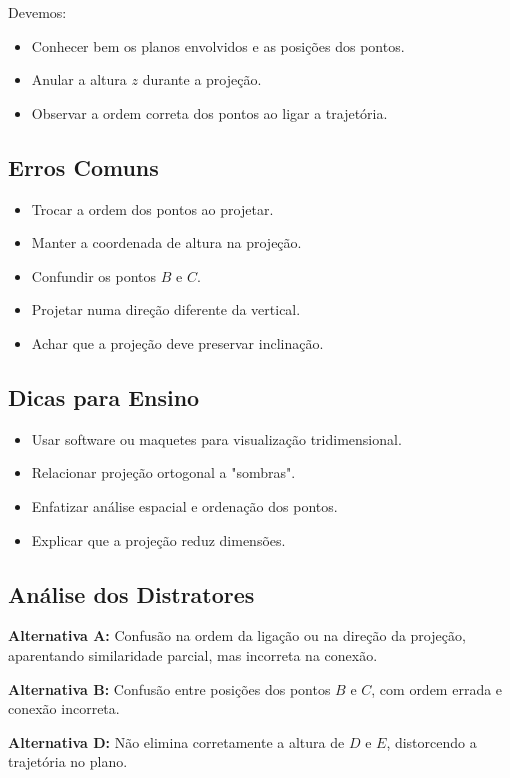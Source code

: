 \documentclass{article}
\begin{document}
Devemos:
\begin{itemize}
  \item Conhecer bem os planos envolvidos e as posições dos pontos.
  \item Anular a altura \( z \) durante a projeção.
  \item Observar a ordem correta dos pontos ao ligar a trajetória.
\end{itemize}

\subsection*{Erros Comuns}
\begin{itemize}
  \item Trocar a ordem dos pontos ao projetar.
  \item Manter a coordenada de altura na projeção.
  \item Confundir os pontos \( B \) e \( C \).
  \item Projetar numa direção diferente da vertical.
  \item Achar que a projeção deve preservar inclinação.
\end{itemize}

\subsection*{Dicas para Ensino}
\begin{itemize}
  \item Usar software ou maquetes para visualização tridimensional.
  \item Relacionar projeção ortogonal a "sombras".
  \item Enfatizar análise espacial e ordenação dos pontos.
  \item Explicar que a projeção reduz dimensões.
\end{itemize}

\subsection*{Análise dos Distratores}

\textbf{Alternativa A:} Confusão na ordem da ligação ou na direção da projeção, aparentando similaridade parcial, mas incorreta na conexão.

\textbf{Alternativa B:} Confusão entre posições dos pontos \( B \) e \( C \), com ordem errada e conexão incorreta.

\textbf{Alternativa D:} Não elimina corretamente a altura de \( D \) e \( E \), distorcendo a trajetória no plano.
\end{document}
